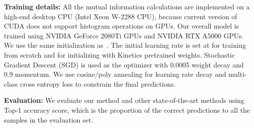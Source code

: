 \documentclass[10pt,twocolumn,letterpaper]{article}
\begin{document}
{\noindent  \textbf{Training details:} All the mutual information calculations are implemented on a high-end desktop CPU (Intel Xeon W-2288 CPU), because current version of CUDA does not support histogram operations on GPUs. Our overall model is trained using NVIDIA GeForce 2080Ti GPUs and NVIDIA RTX A5000 GPUs. We use the same initialization as~\cite{divya2022far}. The initial learning rate is set at  for training from scratch and  for initializing with Kinetics pretrained weights. Stochastic Gradient Descent (SGD) is used as the optimizer with 0.0005 weight decay and 0.9 momentum. We use cosine/poly annealing for learning rate decay and multi-class cross entropy loss to constrain the final predictions.

\noindent  \textbf{Evaluation:} We evaluate our method and other state-of-the-art methods using Top-1 accuracy score, which is the proportion of the correct predictions to all the samples in the evaluation set.



















\begin{table*}[t]
\centering
{}
\vspace{-7pt}
\caption{Ablation studies on UAV-Human subset in terms of using different bin numbers to calculate mutual information, reference image size (times of the standard size), using different strides for slipping windows, and searching area size. The best performance is achieved while using 128 histogram bins, reference image size 1.25 and sliding stride of 10. The size of the searching area does not affect the overall performance of our method. The top-1 accuracy only varies 0.6\% while using different searching area sizes. This demonstrates the robustness of our MITFAS as the larger searching area contains more noises and outliers.}
\vspace{-5pt}
\label{tab:ablation}
\end{table*}


}
\end{document}
